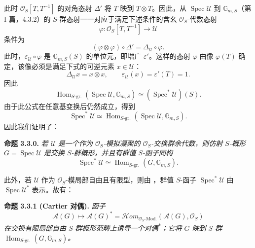 此时 \(\mathcal O_S[T,T^{-1}]\) 的对角态射 \(\Delta'\) 将 \(T\) 映到 \(T\otimes T\)。因此，从 \(\operatorname{Spec}\mathcal U\) 到 \(\mathbb G_{m,S}\)（第 I 篇，4.3.2）的 \(S\)-群态射一一对应于满足下述条件的含幺 \(\mathcal O_S\)-代数态射
\[
  \varphi:\mathcal O_S[T,T^{-1}]\longrightarrow\mathcal U
\]
条件为
\[
  (\varphi\otimes\varphi)\circ\Delta'
  =\Delta_{\mathcal U}\circ\varphi.
\]
此时，\(\varepsilon_{\mathcal U}\circ\varphi\) 是 \(\mathbb G_{m,S}(S)\) 的单位元，即增广 \(\varepsilon'\)。这样的态射 \(\varphi\) 由像 \(\varphi(T)\) 确定，该像必须是满足下式的可逆元素 \(x\in\mathcal U\)：
\[
  \Delta_{\mathcal U}x=x\otimes x,
  \qquad
  \varepsilon_{\mathcal U}(x)=\varepsilon'(T)=1.
\]
因此
\[
  \operatorname{Hom}_{S\text{-gr.}}
  (\operatorname{Spec}\mathcal U,\mathbb G_{m,S})
  \simeq
  (\operatorname{Spec}^{*}\mathcal U)(S).
\]
由于此公式在任意基变换后仍然成立，得到
\[
  \operatorname{Spec}^{*}\mathcal U
  \simeq
  \operatorname{Hom}_{S\text{-gr.}}
  (\operatorname{Spec}\mathcal U,\mathbb G_{m,S}).
\]
因此我们证明了：

\medskip
\noindent\textbf{命题 3.3.0.}
\label{sga3:VIIA:3.3.0}
\textit{若 \(\mathcal U\) 是一个作为 \(\mathcal O_S\)-模拟凝聚的 \(\mathcal O_S\)-交换群余代数，则仿射 \(S\)-概形 \(G=\operatorname{Spec}\mathcal U\) 是交换 \(S\)-群概形，并且有群值 \(S\)-函子同构
\[
  \operatorname{Spec}^{*}\mathcal U
  \simeq
  \operatorname{Hom}_{S\text{-gr.}}(G,\mathbb G_{m,S}).
\]}

此外，若 \(\mathcal U\) 作为 \(\mathcal O_S\)-模局部自由且有限型，则由 ，群值 \(S\)-函子 \(\operatorname{Spec}^{*}\mathcal U\) 由 \(\operatorname{Spec}\mathcal U^{*}\) 表示。故有：

\medskip
\noindent\textbf{命题 3.3.1 (Cartier 对偶).}
\label{sga3:VIIA:3.3.1}
\textit{函子
\[
  \mathscr A(G)\longmapsto
  \mathscr A(G)^{*}
  =
  \mathcal Hom_{\mathcal O_S\text{-Mod.}}
  (\mathscr A(G),\mathcal O_S)
\]
在交换有限局部自由 \(S\)-群概形范畴上诱导一个对偶\textsuperscript{\(\ast\)}；它将 \(G\) 映到 \(S\)-群 \(\operatorname{Hom}_{S\text{-gr.}}(G,\mathbb G_{m,S})\)。}

\begingroup
\renewcommand{\thefootnote}{\fnsymbol{footnote}}
\endgroup

